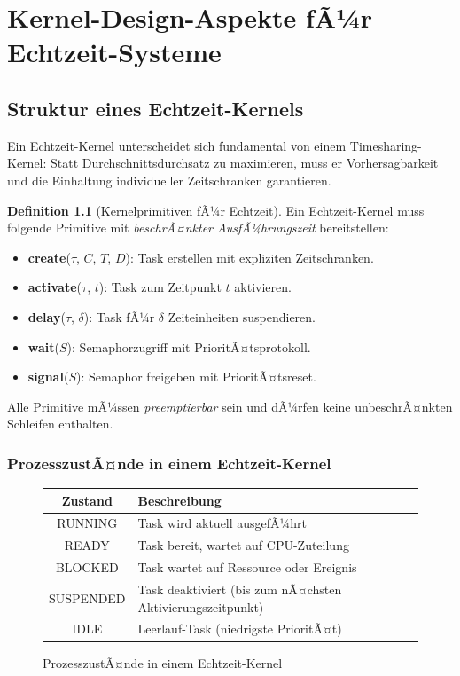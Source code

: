 ﻿\documentclass[a4paper,12pt]{report}
\theoremstyle{definition}
\newtheorem{definition}{Definition}[chapter]
\begin{document}
\chapter{Kernel-Design-Aspekte fÃ¼r Echtzeit-Systeme}
\label{chap:kernel}

\section{Struktur eines Echtzeit-Kernels}

Ein Echtzeit-Kernel unterscheidet sich fundamental von einem Timesharing-Kernel:
Statt Durchschnittsdurchsatz zu maximieren, muss er Vorhersagbarkeit und die
Einhaltung individueller Zeitschranken garantieren.

\begin{definition}[Kernelprimitiven fÃ¼r Echtzeit]
	Ein Echtzeit-Kernel muss folgende Primitive mit \emph{beschrÃ¤nkter AusfÃ¼hrungszeit}
	bereitstellen:
	\begin{itemize}
		\item \textbf{create}($\tau$, $C$, $T$, $D$): Task erstellen mit expliziten Zeitschranken.
		\item \textbf{activate}($\tau$, $t$): Task zum Zeitpunkt $t$ aktivieren.
		\item \textbf{delay}($\tau$, $\delta$): Task fÃ¼r $\delta$ Zeiteinheiten suspendieren.
		\item \textbf{wait}($S$): Semaphorzugriff mit PrioritÃ¤tsprotokoll.
		\item \textbf{signal}($S$): Semaphor freigeben mit PrioritÃ¤tsreset.
	\end{itemize}
	Alle Primitive mÃ¼ssen \emph{preemptierbar} sein und dÃ¼rfen keine unbeschrÃ¤nkten
	Schleifen enthalten.
\end{definition}

\subsection{ProzesszustÃ¤nde in einem Echtzeit-Kernel}

\begin{figure}[H]
	\centering
	\begin{tabular}{|c|l|}
		\hline
		\textbf{Zustand} & \textbf{Beschreibung} \\
		\hline
		RUNNING   & Task wird aktuell ausgefÃ¼hrt \\
		READY     & Task bereit, wartet auf CPU-Zuteilung \\
		BLOCKED   & Task wartet auf Ressource oder Ereignis \\
		SUSPENDED & Task deaktiviert (bis zum nÃ¤chsten Aktivierungszeitpunkt) \\
		IDLE      & Leerlauf-Task (niedrigste PrioritÃ¤t) \\
		\hline
	\end{tabular}
	\caption{ProzesszustÃ¤nde in einem Echtzeit-Kernel}
\end{figure}
\end{document}
